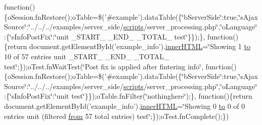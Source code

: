 \begin{DoxyCompactItemize}
function()\{o\+Session.\+fn\+Restore();o\+Table=\$('\#example').data\+Table(\{\char`\"{}b\+Server\+Side\char`\"{}\+:true,\char`\"{}s\+Ajax\+Source\char`\"{}\+:\char`\"{}../../../examples/server\+\_\+side/\hyperlink{tinymce_8jquery_8dev_8js_a09066d4d580eeec222f858d588b4cdef}{scripts}/server\+\_\+processing.\+php\char`\"{},\char`\"{}o\+Language\char`\"{}\+:\{\char`\"{}s\+Info\+Post\+Fix\char`\"{}\+:\char`\"{}unit \+\_\+\+S\+T\+A\+R\+T\+\_\+ \+\_\+\+E\+N\+D\+\_\+ \+\_\+\+T\+O\+T\+A\+L\+\_\+ test\char`\"{}\}\});\}, function()\{return document.\+get\+Element\+By\+Id('example\+\_\+info').\hyperlink{jquery-ui_8js_a87f73c4f0391c1cf9fe60374a76d9a7b}{inner\+H\+T\+M\+L}=\char`\"{}Showing 1 \hyperlink{jquery-ui_8js_af6086621f45baa2cf538f19e45d3c263}{to} 10 of 57 entries unit \+\_\+\+S\+T\+A\+R\+T\+\_\+ \+\_\+\+E\+N\+D\+\_\+ \+\_\+\+T\+O\+T\+A\+L\+\_\+ test\char`\"{};\});o\+Test.\+fn\+Wait\+Test(\char`\"{}Post fix is applied after fintering info\char`\"{}, function()\{o\+Session.\+fn\+Restore();o\+Table=\$('\#example').data\+Table(\{\char`\"{}b\+Server\+Side\char`\"{}\+:true,\char`\"{}s\+Ajax\+Source\char`\"{}\+:\char`\"{}../../../examples/server\+\_\+side/\hyperlink{tinymce_8jquery_8dev_8js_a09066d4d580eeec222f858d588b4cdef}{scripts}/server\+\_\+processing.\+php\char`\"{},\char`\"{}o\+Language\char`\"{}\+:\{\char`\"{}s\+Info\+Post\+Fix\char`\"{}\+:\char`\"{}unit test\char`\"{}\}\});o\+Table.\+fn\+Filter(\char`\"{}nothinghere\char`\"{});\}, function()\{return document.\+get\+Element\+By\+Id('example\+\_\+info').\hyperlink{jquery-ui_8js_a87f73c4f0391c1cf9fe60374a76d9a7b}{inner\+H\+T\+M\+L}=\char`\"{}Showing 0 \hyperlink{jquery-ui_8js_af6086621f45baa2cf538f19e45d3c263}{to} 0 of 0 entries unit (filtered \hyperlink{jquery-ui_8js_ace03b192fd101a1c5648340bc09b7229}{from} 57 total entries) test\char`\"{};\});o\+Test.\+fn\+Complete();\})
\end{DoxyCompactItemize}


